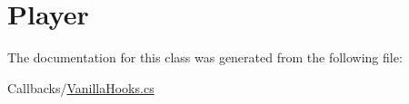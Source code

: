 \hypertarget{classOTA_1_1Callbacks_1_1Player}{}\section{Player}
\label{classOTA_1_1Callbacks_1_1Player}


The documentation for this class was generated from the following file\+:\begin{DoxyCompactItemize}
\item 
Callbacks/\hyperlink{VanillaHooks_8cs}{Vanilla\+Hooks.\+cs}\end{DoxyCompactItemize}
